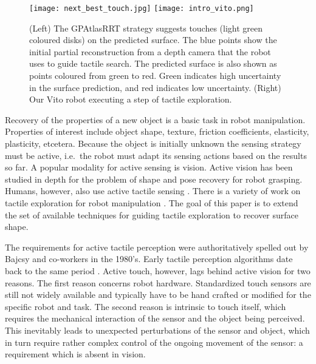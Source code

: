 \begin{figure*}
\centering
  \texttt{[image: next\_best\_touch.jpg]}
  \texttt{[image: intro\_vito.png]}
\caption{(Left) The GPAtlasRRT strategy suggests touches (light green coloured disks) on the predicted surface. The blue points show the initial partial reconstruction from a depth camera that the robot uses to guide tactile search. The predicted surface is also shown as points coloured from green to red. Green indicates high uncertainty in the surface prediction, and red indicates low uncertainty. (Right) Our Vito robot executing a step of tactile exploration.}
\label{fig:setup_solution}
\end{figure*}

Recovery of the properties of a new object is a basic task in robot manipulation. Properties of interest include object shape, texture, friction coefficients, elasticity, plasticity, etcetera. Because the object is initially unknown the sensing strategy must be active, i.e.\ the robot must adapt its sensing actions based on the results so far. A popular modality for active sensing is vision. Active vision has been studied in depth for the problem of shape and pose recovery for robot grasping\cite{Kragic2002TechRep,nunez2013models,arruda16,kopicki2015ijrr,kootstra2012a}. Humans, however, also use active tactile sensing \cite{johansson92}. There is a variety of work on tactile exploration for robot manipulation \cite{zito2013sequential,jentoft2014a,Bjorkman2013Enhancing,Hebert2013Next,Petrovskaya2011Global,guijhr2016,guijhr2017}. The goal of this paper is to extend the set of available techniques for guiding tactile exploration to recover surface shape.

The requirements for active tactile perception were authoritatively spelled out by Bajcsy and co-workers\cite{Bajcsy1988Active} in the 1980's. Early tactile perception algorithms date back to the same period \cite{Grimson1984JRR,Faugeras1983IJCAI,Shekhar1986ICRA,Bajcsy1989Machine}. Active touch, however, lags behind active vision for two reasons. The first reason concerns robot hardware. Standardized touch sensors are still not widely available and typically have to be hand crafted or modified for the specific robot and task. The second reason is intrinsic to touch itself, which requires the mechanical interaction of the sensor and the object being perceived. This inevitably leads to unexpected perturbations of the sensor and object, which in turn require rather complex control of the ongoing movement of the sensor: a requirement which is absent in vision.

